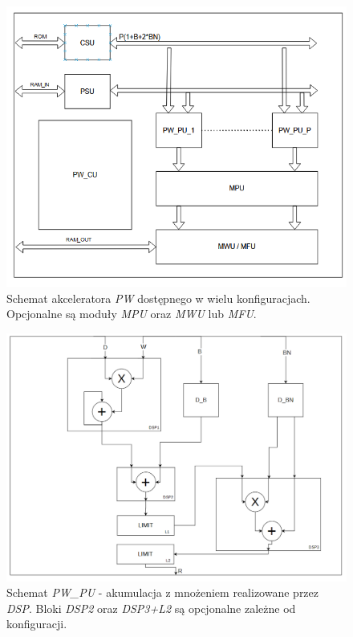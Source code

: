\begin{figure}
    \centering
    \includegraphics[width=0.9\linewidth]{images/PWACC.png}
    \caption{Schemat akceleratora \emph{PW} dostępnego w wielu konfiguracjach.
    Opcjonalne są moduły \emph{MPU} oraz \emph{MWU} lub \emph{MFU}.}
    \label{fig:pwacc}
\end{figure}
\begin{figure}
    \centering
    \includegraphics[width=0.8\linewidth]{images/PW_PU.png}
    \caption{Schemat \emph{PW\_PU} - akumulacja z mnożeniem realizowane przez \emph{DSP}. Bloki \emph{DSP2} oraz \emph{DSP3+L2} są opcjonalne zależne od konfiguracji.}
    \label{fig:pwpu}
\end{figure}

